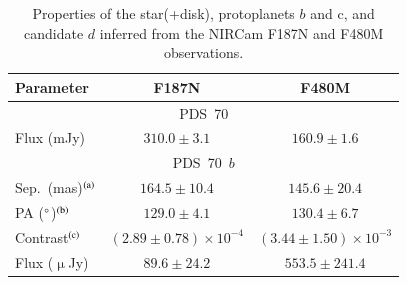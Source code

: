 \documentclass[longauth]{aa}
\begin{document}

\begin{table} 
\begin{center}
\caption{Properties of the star(+disk), protoplanets $b$ and c, and candidate $d$ inferred from the NIRCam F187N and F480M observations.} 
\label{tab:results}
\begin{tabular}{lcc}
\hline
\hline
Parameter & F187N & F480M \\
\hline
\multicolumn{3}{c}{PDS~70}\\
\hline
Flux (mJy) & $310.0 \pm 3.1$ & $160.9 \pm 1.6$ \\
\hline
\multicolumn{3}{c}{PDS~70~$b$}\\
\hline
Sep.\ (mas)$^{\rm (a)}$ & $164.5 \pm 10.4$ & $145.6 \pm 20.4$ \\
PA ($^\circ$)$^{\rm (b)}$ & $129.0 \pm 4.1$ & $130.4 \pm 6.7$ \\
Contrast$^{\rm (c)}$ & $(2.89 \pm 0.78) \times 10^{-4}$ & $(3.44 \pm 1.50) \times 10^{-3}$\\ %
Flux ($\upmu$Jy) & $89.6 \pm 24.2$ & $ 553.5 \pm 
241.4$\\

\end{tabular}
\end{center}
\end{table}
\end{document}
